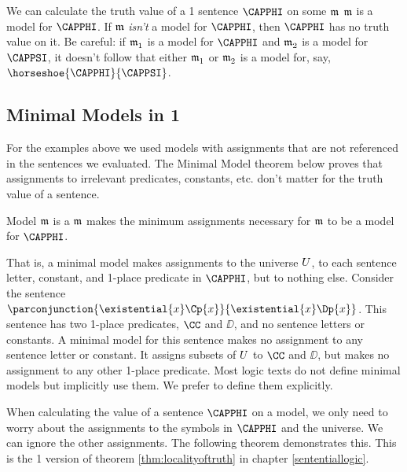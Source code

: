 We can calculate the truth value of a \GQL{}1 sentence $\CAPPHI$ on some $\mathfrak{m}$ \Iff $\mathfrak{m}$ is a model for $\CAPPHI$.  If $\mathfrak{m}$ \emph{isn't} a model for $\CAPPHI$, then $\CAPPHI$ has no truth value on it.  Be careful: if $\mathfrak{m^{\mathrm{}}_{\mathrm{1}}}$ is a model for $\CAPPHI$ and $\mathfrak{m^{\mathrm{}}_{\mathrm{2}}}$ is a model for $\CAPPSI$, it doesn't follow that either $\mathfrak{m^{\mathrm{}}_{\mathrm{1}}}$ or $\mathfrak{m^{\mathrm{}}_{\mathrm{2}}}$ is a model for, say, $\horseshoe{\CAPPHI}{\CAPPSI}$.

\subsection{Minimal Models in \GQL{}1}\label{Minimal Models in GQL1}

For the examples above we used models with assignments that are not referenced in the sentences we evaluated.
The Minimal Model theorem below proves that assignments to irrelevant predicates, constants, etc. don't matter for the truth value of a sentence.

\begin{majorILnc}{}
	Model $\mathfrak{m}$ is a  \Iff $\mathfrak{m}$ makes the minimum assignments necessary for $\mathfrak{m}$ to be a model for $\CAPPHI$.
\end{majorILnc}

\noindent{}That is, a minimal model makes assignments to the universe $U$, to each sentence letter, constant, and 1-place predicate in $\CAPPHI$, but to nothing else.
Consider the sentence $\parconjunction{\existential{\variable{x}}\Cp{\variable{x}}}{\existential{\variable{x}}\Dp{\variable{x}}}$.
This sentence has two 1-place predicates, $\CC$ and $\DD$, and no sentence letters or constants.
A minimal model for this sentence makes no assignment to any sentence letter or constant.
It assigns subsets of $U$ to $\CC$ and $\DD$, but makes no assignment to any other 1-place predicate.
Most logic texts do not define minimal models but implicitly use them.
We prefer to define them explicitly.

When calculating the value of a sentence $\CAPPHI$ on a model, we only need to worry about the assignments to the symbols in $\CAPPHI$ and the universe.
We can ignore the other assignments.
The following theorem demonstrates this.
This is the \GQL{}1 version of theorem \ref{thm:localityoftruth} in chapter \ref{sententiallogic}.

